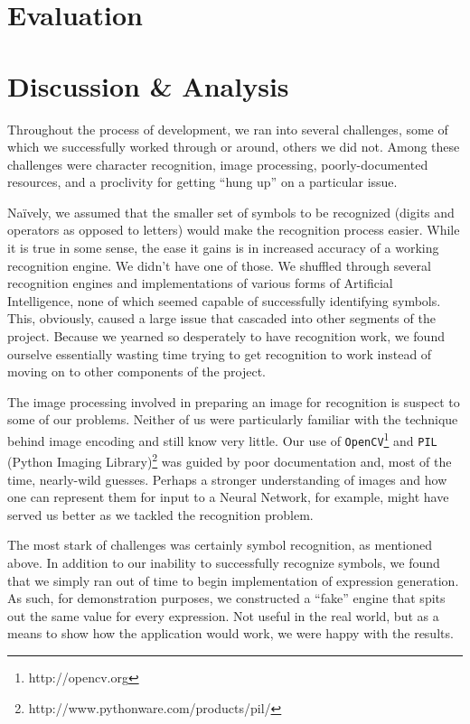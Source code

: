 \documentclass{acm_proc_article-sp}
\begin{document}
\section{Evaluation}

\section{Discussion \& Analysis}
Throughout the process of development, we ran into several challenges, some of which we successfully worked through or around, others we did not. Among these challenges were character recognition, image processing, poorly-documented resources, and a proclivity for getting ``hung up'' on a particular issue.

Na\"{i}vely, we assumed that the smaller set of symbols to be recognized (digits and operators as opposed to letters) would make the recognition process easier. While it is true in some sense, the ease it gains is in increased accuracy of a working recognition engine. We didn't have one of those. We shuffled through several recognition engines and implementations of various forms of Artificial Intelligence, none of which seemed capable of successfully identifying symbols. This, obviously, caused a large issue that cascaded into other segments of the project. Because we yearned so desperately to have recognition work, we found ourselve essentially wasting time trying to get recognition to work instead of moving on to other components of the project.

The image processing involved in preparing an image for recognition is suspect to some of our problems. Neither of us were particularly familiar with the technique behind image encoding and still know very little. Our use of \texttt{OpenCV}\footnote{http://opencv.org} and \texttt{PIL} (Python Imaging Library)\footnote{http://www.pythonware.com/products/pil/} was guided by poor documentation and, most of the time, nearly-wild guesses. Perhaps a stronger understanding of images and how one can represent them for input to a Neural Network, for example, might have served us better as we tackled the recognition problem.

The most stark of challenges was certainly symbol recognition, as mentioned above. In addition to our inability to successfully recognize symbols, we found that we simply ran out of time to begin implementation of expression generation. As such, for demonstration purposes, we constructed a ``fake'' engine that spits out the same value for every expression. Not useful in the real world, but as a means to show how the application would work, we were happy with the results.
\end{document}
